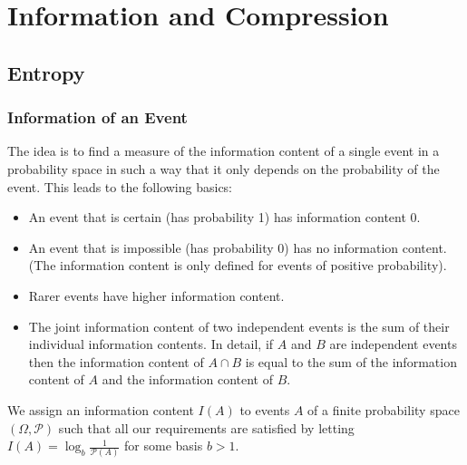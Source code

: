 \documentclass[english]{panikzettel}
\begin{document}
\section{Information and Compression}
\subsection{Entropy}
\subsubsection{Information of an Event}
The idea is to find a measure of the information content of
a single event in a probability space in such a way that it only depends on the probability of the event. This leads to the following basics:
\begin{itemize}
\item An event that is certain (has probability 1) has information content 0.
\item An event that is impossible (has probability 0) has no information content. (The information content is only defined for events of positive probability).
\item Rarer events have higher information content.
\item The joint information content of two independent events is the sum of their individual information contents. In detail, if $A$ and $B$ are independent events then the information content of $A\cap B$ is equal to the sum of the information content of $A$ and the information content of $B$.
\end{itemize}




We assign an information content $I(A)$ to events $A$ of a finite probability space $(\Omega, \mathcal{P})$ such that all our requirements are satisfied by letting $I(A)=\log_b \frac{1}{\mathcal{P}(A)}$ for some basis $b > 1$.
\end{document}
